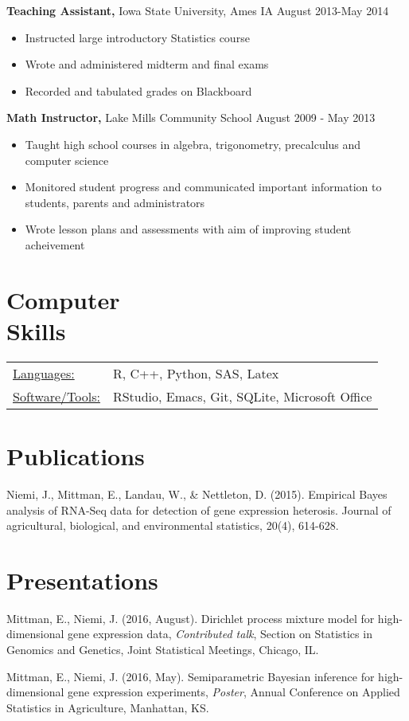 \documentclass[margin]{res}
\begin{document}
\begin{resume}
{\bf Teaching Assistant,} Iowa State University, Ames IA \hfill August 2013-May 2014
\begin{itemize} \itemsep -2pt
\item Instructed large introductory Statistics course
\item Wrote and administered midterm and final exams
\item Recorded and tabulated grades on Blackboard
\end{itemize}

{\bf Math Instructor,} Lake Mills Community School \hfill
August 2009 - May 2013                
                \begin{itemize} \itemsep -2pt
                 \item  Taught high school courses in algebra, trigonometry, precalculus and computer science
                 \item Monitored student progress and communicated important information to students, parents and administrators
                 \item Wrote lesson plans and assessments with aim of improving student acheivement

		 \end{itemize}



\section{Computer \\ Skills}
   \begin{tabular}{l p{3in}}
    \underline{Languages:} & R, C++, Python, SAS, Latex\\
    \underline{Software/Tools:} &  RStudio, Emacs, Git, SQLite, Microsoft Office
 \end{tabular}

\section{Publications}
Niemi, J., Mittman, E., Landau, W., \& Nettleton, D. (2015).
Empirical Bayes analysis of RNA-Seq data for detection of gene expression heterosis. Journal of agricultural, biological, and environmental statistics, 20(4), 614-628.

\section{Presentations}
Mittman, E., Niemi, J. (2016, August). Dirichlet process mixture model for high-dimensional
gene expression data, {\em Contributed talk}, Section on Statistics in Genomics and Genetics, Joint Statistical Meetings, Chicago, IL. 

Mittman, E., Niemi, J. (2016, May). Semiparametric Bayesian inference for high-dimensional gene expression experiments, {\em Poster}, Annual Conference on Applied Statistics in Agriculture, Manhattan, KS.

\end{resume} 
\end{document}
